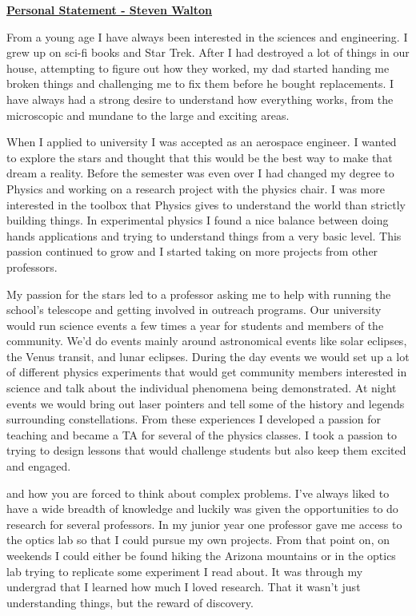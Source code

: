 \documentclass[12pt]{article}
\begin{document}
\begin{center}
\underline{\bf Personal Statement - Steven Walton}\\
\end{center}
From a young age I have always been interested in the sciences and engineering.
I grew up on sci-fi books and Star Trek. After I had destroyed a lot of things
in our house, attempting to figure out how they worked, my dad started handing
me broken things and challenging me to fix them before he bought replacements. I
have always had a strong desire to understand how everything works, from the
microscopic and mundane to the large and exciting areas. 

When I applied to university I was accepted as an aerospace engineer. I wanted
to explore the stars and thought that this would be the best way to make that
dream a reality. Before the semester was even over I had changed my degree to
Physics and working on a research project with the physics chair. I was more
interested in the toolbox that Physics gives to understand the world than
strictly building things. In experimental physics I found a nice balance between
doing hands applications and trying to understand things from a very basic
level. This passion continued to grow and I started taking on more projects from
other professors. 

My passion for the stars led to a professor asking me to help
with running the school's telescope and getting involved in outreach programs.
Our university would run science events a few times a year for students and
members of the community. We'd do events mainly around astronomical events like
solar eclipses, the Venus transit, and lunar eclipses. During the day events we
would set up a lot of different physics experiments that would get community
members interested in science and talk about the individual phenomena being
demonstrated. At night events we would bring out laser pointers and tell some of
the history and legends surrounding constellations. From these experiences I
developed a passion for teaching and became a TA for several of the physics
classes. I took a passion to trying to design lessons that would challenge
students but also keep them excited and engaged. 

and how you
are forced to think about complex problems. I've always liked to have a wide
breadth of knowledge and luckily was given the opportunities to do research for
several professors. In my junior year one professor gave me access to the optics
lab so that I could pursue my own projects. From that point on, on weekends I
could either be found hiking the Arizona mountains or in the optics lab trying
to replicate some experiment I read about. It was through my undergrad that I
learned how much I loved research. That it wasn't just understanding things, but
the reward of discovery. 
\end{document}

